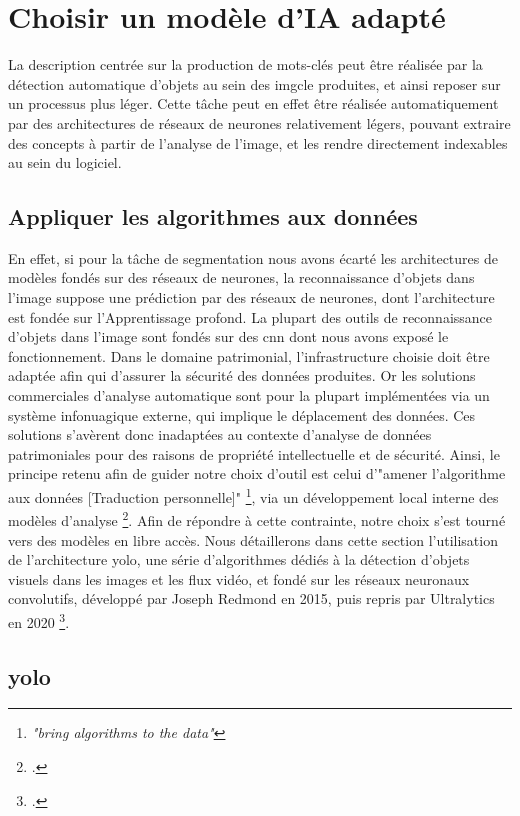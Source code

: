 \section{\label{II_2_A}Choisir un modèle d'IA adapté}

La description centrée sur la production de mots-clés peut être réalisée par la détection automatique d'objets au sein des \gls{imgcle} produites, et ainsi reposer sur un processus plus léger. Cette tâche peut en effet être réalisée automatiquement par des architectures de réseaux de neurones relativement légers, pouvant extraire des concepts à partir de l'analyse de l'image, et les rendre directement indexables au sein du logiciel.  

\subsection{Appliquer les algorithmes aux données}

En effet, si pour la tâche de segmentation nous avons écarté les architectures de modèles fondés sur des réseaux de neurones, la reconnaissance d'objets dans l'image suppose une prédiction par des réseaux de neurones, dont l'architecture est fondée sur l'\gls{Apprentissage profond}. La plupart des outils de reconnaissance d'objets dans l'image sont fondés sur des \gls{cnn} dont nous avons exposé le fonctionnement. Dans le domaine patrimonial, l'infrastructure choisie doit être adaptée afin qui d'assurer la sécurité des données produites. Or les solutions commerciales d'analyse automatique sont pour la plupart implémentées via un système infonuagique externe, qui implique le déplacement des données. Ces solutions s'avèrent donc inadaptées au contexte d'analyse de données patrimoniales pour des raisons de propriété intellectuelle et de sécurité. Ainsi, le principe retenu afin de guider notre choix d'outil est celui d'"amener l'algorithme aux données [Traduction personnelle]" \footnote{\textit{"bring algorithms to the data"}}, via un développement local interne des modèles d'analyse \footcite{noord2021}. Afin de répondre à cette contrainte, notre choix s'est tourné vers des modèles en libre accès. Nous détaillerons dans cette section l’utilisation de l’architecture \gls{yolo}, une série d’algorithmes dédiés à la détection d’objets visuels dans les images et les flux vidéo, et fondé sur les réseaux neuronaux convolutifs, développé par Joseph Redmond en 2015, puis repris par Ultralytics en 2020 \footcite{talbi2025}. 


\subsection{\gls{yolo}}

